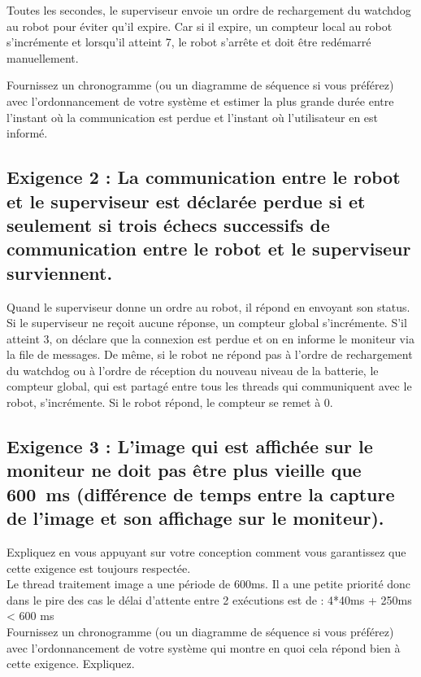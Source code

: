 \documentclass[11pt, a4paper]{paper}
\begin{document}
{\color{black} Toutes les secondes, le superviseur envoie un ordre de rechargement du watchdog au robot pour éviter qu'il expire. Car si il expire, un compteur local au robot s'incrémente et lorsqu'il atteint 7, le robot s'arrête et doit être redémarré manuellement. 

{\color{blue} Fournissez un chronogramme (ou un diagramme de séquence si vous préférez) avec l’ordonnancement de votre système et estimer la plus grande durée entre l'instant où la communication est perdue et l'instant où l'utilisateur en est informé.}

\subsection{Exigence 2 : La communication entre le robot et le superviseur est déclarée perdue si et seulement si trois échecs successifs de communication entre le robot et le superviseur surviennent.}

{\color{black} Quand le superviseur donne un ordre au robot, il répond en envoyant son status. Si le superviseur ne reçoit aucune réponse, un compteur global s'incrémente. S'il atteint 3, on déclare que la connexion est perdue et on en informe le moniteur via la file de messages. De même, si le robot ne répond pas à l'ordre de rechargement du watchdog ou à l'ordre de réception du nouveau niveau de la batterie, le compteur global, qui est partagé entre tous les threads qui communiquent avec le robot, s'incrémente. Si le robot répond, le compteur se remet à 0. }

\subsection{Exigence 3 : 
L'image qui est  affichée sur le moniteur ne doit pas être plus vieille que 600~ms (différence de temps entre la capture de l'image et son affichage sur le moniteur).}

{\color{blue} Expliquez en vous appuyant sur votre conception comment vous garantissez que cette exigence est toujours respectée. \\}
{\color{black}Le thread traitement image a une période de 600ms. Il a une petite priorité donc dans le pire des cas le délai d'attente entre 2 exécutions est de :  4*40ms + 250ms < 600 ms \\}
{\color{blue} Fournissez un chronogramme (ou un diagramme de séquence si vous préférez) avec l’ordonnancement de votre système qui montre en quoi cela répond bien à cette exigence. Expliquez.}


}
\end{document}
